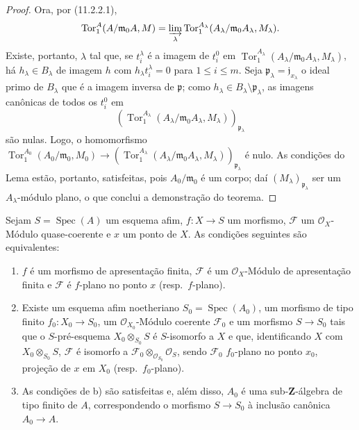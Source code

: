 \begin{proof}
Ora, por (11.2.2.1),
\[
\operatorname{Tor}_1^A(A/\mathfrak m_0A,M)
=\varinjlim_\lambda\operatorname{Tor}_1^{A_\lambda}
(A_\lambda/\mathfrak m_0A_\lambda,M_\lambda).
\]
Existe, portanto, $\lambda$ tal que, se $t_i^\lambda$ é a imagem de $t_i^0$ em $\operatorname{Tor}_1^{A_\lambda}(A_\lambda/\mathfrak m_0A_\lambda,M_\lambda)$, há $h_\lambda\in B_\lambda$ de imagem $h$ com $h_\lambda t_i^\lambda=0$ para $1\leq i\leq m$. Seja $\mathfrak p_\lambda=\mathfrak j_{x_\lambda}$ o ideal primo de $B_\lambda$ que é a imagem inversa de $\mathfrak p$; como $h_\lambda\in B_\lambda\setminus\mathfrak p_\lambda$, as imagens canônicas de todos os $t_i^0$ em
\[
(\operatorname{Tor}_1^{A_\lambda}
(A_\lambda/\mathfrak m_0A_\lambda,M_\lambda))_{\mathfrak p_\lambda}
\]
são nulas. Logo, o homomorfismo $\operatorname{Tor}_1^{A_0}(A_0/\mathfrak m_0,M_0)\to(\operatorname{Tor}_1^{A_\lambda}(A_\lambda/\mathfrak m_0A_\lambda,M_\lambda))_{\mathfrak p_\lambda}$ é nulo. As condições do Lema  estão, portanto, satisfeitas, pois $A_0/\mathfrak m_0$ é um corpo; daí $(M_\lambda)_{\mathfrak p_\lambda}$ ser um $A_\lambda$-módulo plano, o que conclui a demonstração do teorema.
\end{proof}

\begin{corollary}[11.2.7]
\label{IV.11.2.7}
Sejam $S=\operatorname{Spec}(A)$ um esquema afim, $f:X\to S$ um morfismo, $\mathcal F$ um $\mathcal O_X$-Módulo quase-coerente e $x$ um ponto de $X$. As condições seguintes são equivalentes:
\begin{enumerate}[label=\emph{\alph*)}]
\item $f$ é um morfismo de apresentação finita, $\mathcal F$ é um $\mathcal O_X$-Módulo de apresentação finita e $\mathcal F$ é $f$-plano no ponto $x$ (resp.\ $f$-plano).


\item Existe um esquema afim noetheriano $S_0=\operatorname{Spec}(A_0)$, um morfismo de tipo finito $f_0:X_0\to S_0$, um $\mathcal O_{X_0}$-Módulo coerente $\mathcal F_0$ e um morfismo $S\to S_0$ tais que o $S$-pré-esquema $X_0\otimes_{S_0}S$ é $S$-isomorfo a $X$ e que, identificando $X$ com $X_0\otimes_{S_0}S$, $\mathcal F$ é isomorfo a $\mathcal F_0\otimes_{\mathcal O_{S_0}}\mathcal O_S$, sendo $\mathcal F_0$ $f_0$-plano no ponto $x_0$, projeção de $x$ em $X_0$ (resp.\ $f_0$-plano).
\item As condições de b) são satisfeitas e, além disso, $A_0$ é uma sub-$\mathbf Z$-álgebra de tipo finito de $A$, correspondendo o morfismo $S\to S_0$ à inclusão canônica $A_0\to A$.
\end{enumerate}
\end{corollary}

